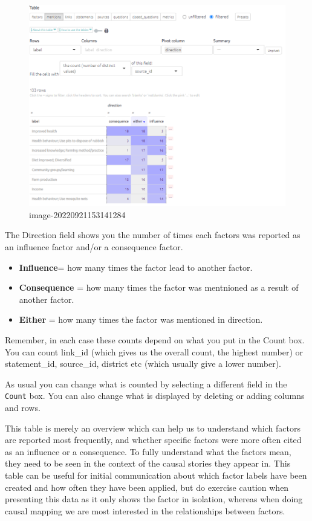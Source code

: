 \documentclass[
]{book}
\providecommand{\tightlist}{%
  \setlength{\itemsep}{0pt}\setlength{\parskip}{0pt}}
\begin{document}
\begin{figure}
\centering
\includegraphics[width=6.77083in,height=\textheight]{_assets/image-20220921153141284.png}
\caption{image-20220921153141284}
\end{figure}

The Direction field shows you the number of times each factors was reported as an influence factor and/or a consequence factor.

\begin{itemize}
\tightlist
\item
  \textbf{Influence}= how many times the factor lead to another factor.
\item
  \textbf{Consequence} = how many times the factor was mentnioned as a result of another factor.
\item
  \textbf{Either} = how many times the factor was mentioned in direction.
\end{itemize}

Remember, in each case these counts depend on what you put in the Count box. You can count link\_id (which gives us the overall count, the highest number) or statement\_id, source\_id, district etc (which usually give a lower number).

As usual you can change what is counted by selecting a different field in the \texttt{Count} box. You can also change what is displayed by deleting or adding columns and rows.

This table is merely an overview which can help us to understand which factors are reported most frequently, and whether specific factors were more often cited as an influence or a consequence. To fully understand what the factors mean, they need to be seen in the context of the causal stories they appear in. This table can be useful for initial communication about which factor labels have been created and how often they have been applied, but do exercise caution when presenting this data as it only shows the factor in isolation, whereas when doing causal mapping we are most interested in the relationships between factors.
\end{document}

